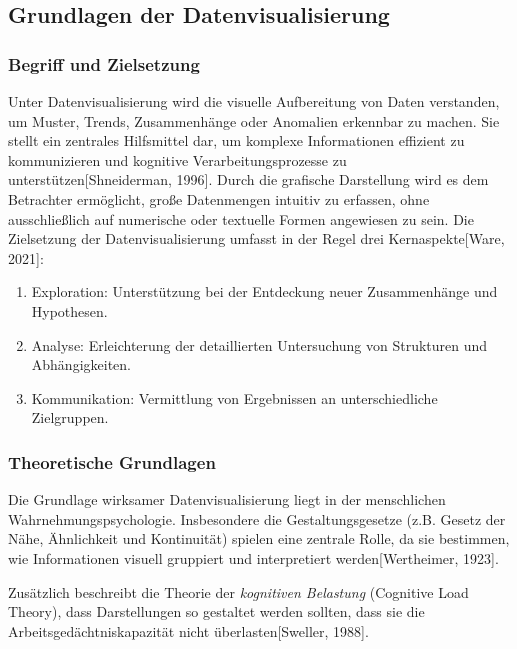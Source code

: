 \subsection{Grundlagen der Datenvisualisierung}
\label{subsec:grundlagen-der-datenvisualisierung}

\subsubsection{Begriff und Zielsetzung}

Unter Datenvisualisierung wird die visuelle Aufbereitung von Daten verstanden, um Muster, Trends, Zusammenhänge
oder Anomalien erkennbar zu machen.
Sie stellt ein zentrales Hilfsmittel dar, um komplexe Informationen effizient zu kommunizieren und kognitive
Verarbeitungsprozesse zu unterstützen[Shneiderman, 1996].
Durch die grafische Darstellung wird es dem Betrachter ermöglicht, große Datenmengen intuitiv zu erfassen,
ohne ausschließlich auf numerische oder textuelle Formen angewiesen zu sein.
Die Zielsetzung der Datenvisualisierung umfasst in der Regel drei Kernaspekte[Ware, 2021]:

\begin{enumerate}

\item
Exploration: Unterstützung bei der Entdeckung neuer Zusammenhänge und Hypothesen.
\item
Analyse: Erleichterung der detaillierten Untersuchung von Strukturen und Abhängigkeiten.
\item
Kommunikation: Vermittlung von Ergebnissen an unterschiedliche Zielgruppen.

\end{enumerate}

\subsubsection{Theoretische Grundlagen}

Die Grundlage wirksamer Datenvisualisierung liegt in der menschlichen Wahrnehmungspsychologie.
Insbesondere die Gestaltungsgesetze (z.B. Gesetz der Nähe, Ähnlichkeit und Kontinuität) spielen eine zentrale Rolle,
da sie bestimmen, wie Informationen visuell gruppiert und interpretiert werden[Wertheimer, 1923].

Zusätzlich beschreibt die Theorie der \textit{kognitiven Belastung} (Cognitive Load Theory),
dass Darstellungen so gestaltet werden sollten, dass sie die Arbeitsgedächtniskapazität nicht überlasten[Sweller, 1988].


